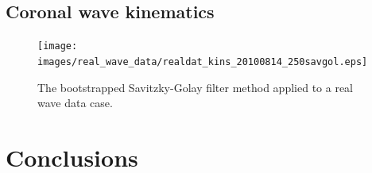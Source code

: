 \documentclass[structabstract]{aa}
\begin{document}





\subsection{Coronal wave kinematics}
\label{subsect:corpita}

\begin{figure}[!t]
\centering
\texttt{[image: images/real\_wave\_data/realdat\_kins\_20100814\_250savgol.eps]}
\caption{The bootstrapped Savitzky-Golay filter method applied to a real wave data case.} %
\label{fig_savgol_wave}
\end{figure}




\section{Conclusions}
\label{sect:conclusions}
\end{document}
